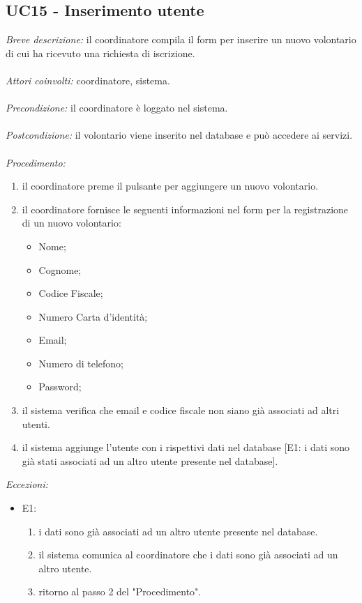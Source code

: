 \subsection{UC15 - Inserimento utente}
\textit{Breve descrizione:} il coordinatore compila il form per inserire un nuovo volontario di cui ha ricevuto una richiesta di iscrizione. 
\\
\\
\textit{Attori coinvolti:} coordinatore, sistema.
\\
\\
\textit{Precondizione:} il coordinatore è loggato nel sistema.
\\
\\
\textit{Postcondizione:} il volontario viene inserito nel database e può accedere ai servizi.
\\
\\
\textit{Procedimento:}
\begin{enumerate}
	\item il coordinatore preme il pulsante per aggiungere un nuovo volontario.
	\item il coordinatore fornisce le seguenti informazioni nel form per la registrazione di un nuovo volontario:
	\begin{itemize}
		\item Nome;
		\item Cognome;
		\item Codice Fiscale;
		\item Numero Carta d'identità;
		\item Email;
		\item Numero di telefono;
		\item Password;
	\end{itemize}
	\item il sistema verifica che email e codice fiscale non siano già associati ad altri utenti.
	\item il sistema aggiunge l'utente con i rispettivi dati nel database [E1: i dati sono già stati associati ad un altro utente presente nel database].
\end{enumerate}


\textit{Eccezioni:}
\begin{itemize}
	\item E1:
	\begin{enumerate}
		\item i dati sono già associati ad un altro utente presente nel database.
		\item il sistema comunica al coordinatore che i dati sono già associati ad un altro utente.
		\item ritorno al passo 2 del "Procedimento".
	\end{enumerate}
\end{itemize}

